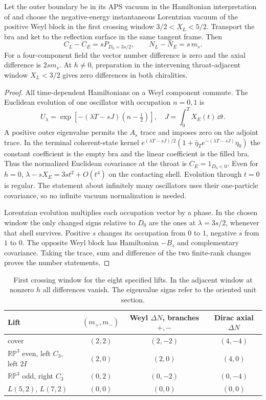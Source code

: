 \begin{theorem}\label{thm:fermions}
Let the outer boundary be in its APS vacuum in the Hamiltonian interpretation of \cite{KY} and choose the negative-energy instantaneous Lorentzian vacuum of the positive Weyl block in the first crossing window $3/2<X_L<5/2$. Transport the bra and ket to the reflection surface in the same tangent frame. Then
\[
 C_L-C_E=sP_{D_0=3s/2},\qquad N_L-N_E=s\,m_s .
\]
For a four-component field the vector number difference is zero and the axial difference is $2s m_s$. At $h\ne0$, preparation in the intervening throat-adjacent window $X_L<3/2$ gives zero differences in both chiralities.
\end{theorem}
\begin{proof}
All time-dependent Hamiltonians on a Weyl component commute. The Euclidean evolution of one oscillator with occupation $n=0,1$ is
\[
 U_\lambda=\exp[-(\lambda T-sJ)(n-\tfrac12)],\quad
 J=\int_0^T X_E(t)\,\dd t .
\]
A positive outer eigenvalue permits the $A_s$ trace and imposes zero on the adjoint trace. In the terminal coherent-state kernel $e^{(\lambda T-sJ)/2}(1+\bar\eta_T e^{-(\lambda T-sJ)}\eta_0)$ the constant coefficient is the empty bra and the linear coefficient is the filled bra. Thus the normalized Euclidean covariance at the throat is $C_E=1_{D_0<0}$. Even for $h=0$, $\lambda-sX_E=3s t^2+O(t^4)$ on the contacting shell. Evolution through $t=0$ is regular. The statement about infinitely many oscillators uses their one-particle covariance, so no infinite vacuum normalization is needed.

Lorentzian evolution multiplies each occupation vector by a phase. In the chosen window the only changed signs relative to $D_0$ are the ones at $\lambda=3s/2$, whenever that shell survives. Positive $s$ changes its occupation from $0$ to $1$, negative $s$ from $1$ to $0$. The opposite Weyl block has Hamiltonian $-B_s$ and complementary covariance. Taking the trace, sum and difference of the two finite-rank changes proves the number statements.
\end{proof}

\begin{table}[htbp]\centering
\begin{tabular}{lccc}
\toprule
Lift & $(m_+,m_-)$ & Weyl $\Delta N$, branches $+,-$ & Dirac axial $\Delta N$\\
\midrule
cover & $(2,2)$ & $(2,-2)$ & $(4,-4)$\\
$\mathbb{RP}^3$ even, left $C_3$, left $2I$ & $(2,0)$ & $(2,0)$ & $(4,0)$\\
$\mathbb{RP}^3$ odd, right $C_3$ & $(0,2)$ & $(0,-2)$ & $(0,-4)$\\
$L(5,2)$, $L(7,2)$ & $(0,0)$ & $(0,0)$ & $(0,0)$\\
\bottomrule
\end{tabular}
\caption{First crossing window for the eight specified lifts. In the adjacent window at nonzero $h$ all differences vanish. The eigenvalue signs refer to the oriented unit section.}
\end{table}

